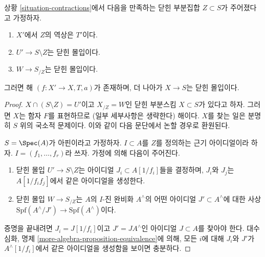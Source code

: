 \begin{lemma}
\label{lemma-closed-immersion}
상황 \ref{situation-contractions}에서 다음을 만족하는 닫힌 부분집합
$Z \subset S$가 주어졌다고 가정하자.
\begin{enumerate}
\item $X'$에서 $Z$의 역상은 $T'$이다.
\item $U' \to S \setminus Z$는 닫힌 몰입이다.
\item $W \to S_{/Z}$는 닫힌 몰입이다.
\end{enumerate}
그러면 해 $(f : X' \to X, T, a)$가 존재하며,
더 나아가 $X \to S$는 닫힌 몰입이다.
\end{lemma}

\begin{proof}
$X \cap (S \setminus Z) = U'$이고 $X_{/Z} = W$인 닫힌 부분스킴
$X \subset S$가 있다고 하자. 그러면 $X$는 함자 $F$를 표현하므로
(일부 세부사항은 생략한다) 해이다. $X$를 찾는 일은 분명히 $S$ 위의
국소적 문제이다. 이와 같이 다음 문단에서 논할 경우로 환원된다.

\medskip\noindent
$S = \Spec(A)$가 아핀이라고 가정하자.
$I \subset A$를 $Z$를 정의하는 근기 아이디얼이라 하자.
$I = (f_1, \ldots, f_r)$라 쓰자. 가정에 의해 다음이 주어진다.
\begin{enumerate}
\item 닫힌 몰입 $U' \to S \setminus Z$는 아이디얼
$J_i \subset A[1/f_i]$들을 결정하며, $J_i$와 $J_j$는
$A[1/f_if_j]$에서 같은 아이디얼을 생성한다.
\item 닫힌 몰입 $W \to S_{/Z}$는 $A$의 $I$-진 완비화 $A^\wedge$의
어떤 아이디얼 $J' \subset A^\wedge$에 대한 사상
$\text{Spf}(A^\wedge/J') \to \text{Spf}(A^\wedge)$이다.
\end{enumerate}
증명을 끝내려면 $J_i = J[1/f_i]$이고 $J' = JA^\wedge$인 아이디얼
$J \subset A$를 찾아야 한다. 대수 심화, 명제
\ref{more-algebra-proposition-equivalence}에 의해,
모든 $i$에 대해 $J_i$와 $J'$가 $A^\wedge[1/f_i]$에서 같은 아이디얼을
생성함을 보이면 충분하다.


\end{proof}
